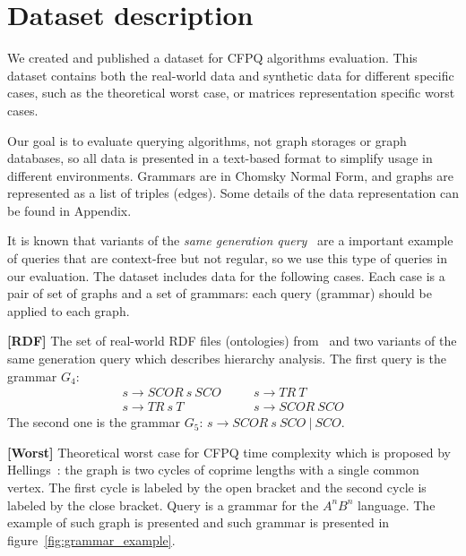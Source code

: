 \section{Dataset description}

We created and published a dataset for CFPQ algorithms evaluation.
This dataset contains both the real-world data and synthetic data for different specific cases, such as the theoretical worst case, or matrices representation specific worst cases.

Our goal is to evaluate querying algorithms, not graph storages or graph databases, so all data is presented in a text-based format to simplify usage in different environments.
Grammars are in Chomsky Normal Form, and graphs are represented as a list of triples (edges).
Some details of the data representation can be found in Appendix.

It is known that variants of the \textit{same generation query}~\cite{FndDB} are a important example of queries that are context-free but not regular, so we use this type of queries in our evaluation.
The dataset includes data for the following cases.
Each case is a pair of set of graphs and a set of grammars: each query (grammar) should be applied to each graph.

\textbf{[RDF]} The set of real-world RDF files (ontologies) from~\cite{RDF} and two variants of the same generation query which describes hierarchy analysis.
The first query is the grammar $G_4$:
\[
 \begin{array}{lcl}
   s  \rightarrow \textit{SCOR} \ s \ \textit{SCO}   & \quad & s  \rightarrow \textit{TR} \ \textit{T}     \\
   s  \rightarrow  \textit{TR}  \ s \ \textit{T}     & \quad & s  \rightarrow \textit{SCOR} \ \textit{SCO}

 \end{array}
 \]
The second one is the grammar $G_5$: $s \rightarrow \textit{SCOR} \ s \ \textit{SCO} \ | \  \textit{SCO}$.

\textbf{[Worst]} Theoretical worst case for CFPQ time complexity which is proposed by Hellings~\cite{hellingsPathQuerying}: the graph is two cycles of coprime lengths with a single common vertex.
The first cycle is labeled by the open bracket and the second cycle is labeled by the close bracket.
Query is a grammar for the $A^nB^n$ language.
The example of such graph is presented and such grammar is presented in figure~\ref{fig:grammar_example}.

